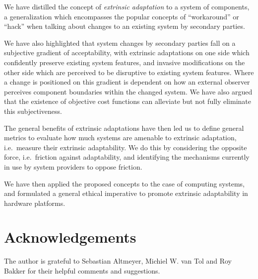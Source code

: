 \documentclass[a4paper]{article}
\newcommand{\ie}{i.e.~}
\begin{document}
We have distilled the concept of \emph{extrinsic adaptation} to a system
of components, a generalization which encompasses the popular concepts
of ``workaround'' or ``hack'' when talking about changes to an
existing system by secondary parties.

We have also highlighted that system changes by secondary parties fall
on a subjective gradient of acceptability, with extrinsic adaptations
on one side which confidently preserve existing system features, and
invasive modifications on the other side which are perceived to be
disruptive to existing
system features. Where a change is positioned on this gradient is
dependent on how an external observer perceives component boundaries
within the changed system. We have also argued that the existence of
objective cost functions can alleviate but not fully eliminate this
subjectiveness.

The general benefits of extrinsic adaptations have then led us to
define general metrics to evaluate how much systems are amenable to
extrinsic adaptation, \ie measure their extrinsic adaptability. We do
this by considering the opposite force, \ie friction against
adaptability, and identifying the mechanisms currently in use by
system providers to oppose friction.

We have then applied the proposed concepts to the case of computing
systems, and formulated a general ethical imperative to promote
extrinsic adaptability in hardware platforms.

\section*{Acknowledgements}

The author is grateful to Sebastian Altmeyer, Michiel W. van Tol and
Roy Bakker for their helpful comments and suggestions.

\nocite{poss.13.coord}

\newcommand{\etalchar}[1]{#1} 


\end{document}
